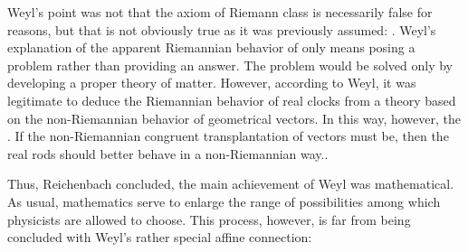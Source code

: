 \documentclass[draft]{article}
\begin{document}
%
%
Weyl's point was not that the axiom of Riemann class is necessarily false for \apr reasons, but that is not obviously true as it was previously assumed: . Weyl's explanation of the apparent Riemannian behavior of   \citep[368]{Reichenbach1922a} only means posing a problem rather than providing an answer. The problem would be solved only by developing a proper theory of matter. However, according to Weyl, it was legitimate to deduce the Riemannian behavior of real clocks from a theory based on the non-Riemannian behavior of geometrical vectors. In this way, however, the   \citep[368]{Reichenbach1922a}. If the non-Riemannian congruent transplantation of vectors must be, then the real rods should better behave in a non-Riemannian way.. 

Thus, Reichenbach concluded, the main achievement of Weyl was mathematical. As usual, mathematics serve to enlarge the range of possibilities among which physicists are allowed to choose. This process, however, is  far from being concluded with Weyl's rather special affine connection:
\end{document}
